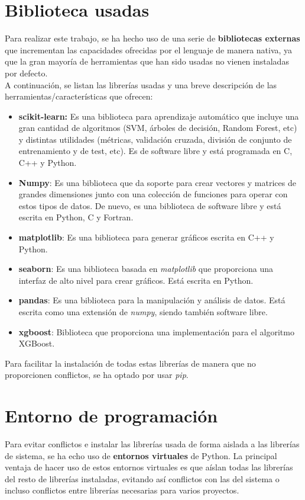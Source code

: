 \section{Biblioteca usadas}
Para realizar este trabajo, se ha hecho uso de una serie de \textbf{bibliotecas externas} que incrementan las capacidades ofrecidas por el lenguaje de manera nativa, ya que la gran mayoría de herramientas que han sido usadas no vienen instaladas por defecto.\\
A continuación, se listan las librerías usadas y una breve descripción de las herramientas/características que ofrecen:
\begin{itemize}
    \item \textbf{scikit-learn:} Es una biblioteca para aprendizaje automático que incluye una gran cantidad de algoritmos (SVM, árboles de decisión, Random Forest, etc) y distintas utilidades (métricas, validación cruzada, división de conjunto de entrenamiento y de test, etc). Es de software libre y está programada en C, C++ y Python.
    \item \textbf{Numpy}: Es una biblioteca que da soporte para crear vectores y matrices de grandes dimensiones junto con una colección de funciones para operar con estos tipos de datos. De nuevo, es una biblioteca de software libre y está escrita en Python, C y Fortran.
    \item \textbf{matplotlib}: Es una biblioteca para generar gráficos escrita en C++ y Python.
     \item \textbf{seaborn}: Es una biblioteca basada en \textit{matplotlib} que proporciona una interfaz de alto nivel para crear gráficos. Está escrita en Python.
     \item \textbf{pandas}: Es una biblioteca para la manipulación y análisis de datos.  Está escrita como una extensión de \textit{numpy}, siendo también software libre.
     \item \textbf{xgboost}: Biblioteca que proporciona una implementación para el algoritmo XGBoost.
\end{itemize}
Para facilitar la instalación de todas estas librerías de manera que no proporcionen conflictos, se ha optado por usar \textit{pip}.
\section{Entorno de programación}
Para evitar conflictos e instalar las librerías usada de forma aislada a las librerías de sistema, se ha echo uso de \textbf{entornos virtuales} de Python. La principal ventaja de hacer uso de estos entornos virtuales es que aíslan todas las librerías del resto de librerías instaladas, evitando así conflictos con las del sistema o incluso conflictos entre librerías necesarias para varios proyectos.
